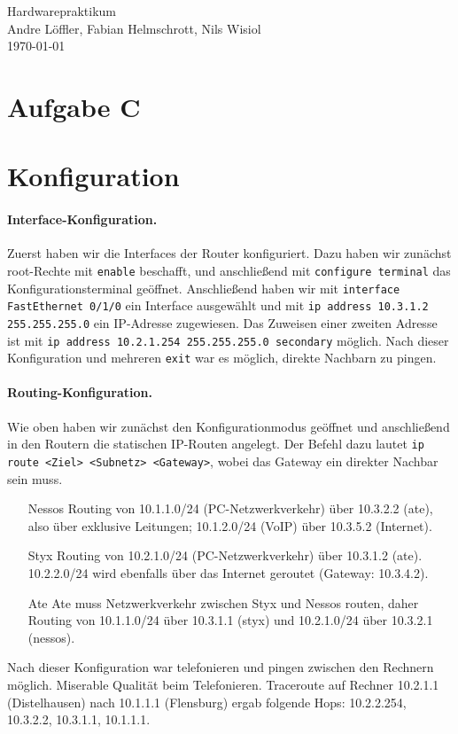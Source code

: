 \documentclass[a4paper,10pt]{scrartcl}
\begin{document}
\begin{center}
  \Huge Hardwarepraktikum \\
  \large Andre Löffler, Fabian Helmschrott, Nils Wisiol \\
  \today
\end{center}


\section*{Aufgabe C}

\section{Konfiguration}

\paragraph*{Interface-Konfiguration.} Zuerst haben wir die Interfaces der Router konfiguriert. Dazu haben wir zunächst root-Rechte mit \texttt{enable} beschafft, und anschließend mit \texttt{configure terminal} das Konfigurationsterminal geöffnet. Anschließend haben wir mit \texttt{interface FastEthernet 0/1/0} ein Interface ausgewählt und mit \texttt{ip address 10.3.1.2 255.255.255.0} ein IP-Adresse zugewiesen. Das Zuweisen einer zweiten Adresse ist mit \texttt{ip address 10.2.1.254 255.255.255.0 secondary} möglich. Nach dieser Konfiguration und mehreren \texttt{exit} war es möglich, direkte Nachbarn zu pingen.

\paragraph*{Routing-Konfiguration.} Wie oben haben wir zunächst den Konfigurationmodus geöffnet und anschließend in den Routern die statischen IP-Routen angelegt. Der Befehl dazu lautet \texttt{ip route <Ziel> <Subnetz> <Gateway>}, wobei das Gateway ein direkter Nachbar sein muss.
\begin{enumerate}
 \item[Nessos] Routing von 10.1.1.0/24 (PC-Netzwerkverkehr) über 10.3.2.2 (ate), also über exklusive Leitungen; 10.1.2.0/24 (VoIP) über 10.3.5.2 (Internet).
 \item[Styx] Routing von 10.2.1.0/24 (PC-Netzwerkverkehr) über 10.3.1.2 (ate). 10.2.2.0/24 wird ebenfalls über das Internet geroutet (Gateway: 10.3.4.2).
 \item[Ate] Ate muss Netzwerkverkehr zwischen Styx und Nessos routen, daher Routing von 10.1.1.0/24 über 10.3.1.1 (styx) und 10.2.1.0/24 über 10.3.2.1 (nessos).
\end{enumerate}
Nach dieser Konfiguration war telefonieren und pingen zwischen den Rechnern möglich. Miserable Qualität beim Telefonieren. Traceroute auf Rechner 10.2.1.1 (Distelhausen) nach 10.1.1.1 (Flensburg) ergab folgende Hops: 10.2.2.254, 10.3.2.2, 10.3.1.1, 10.1.1.1.
\end{document}
